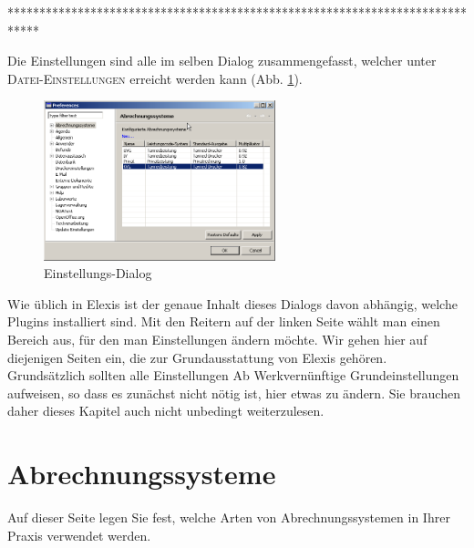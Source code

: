  *****************************************************************************
%

\label{settings}
Die Einstellungen sind alle im selben Dialog zusammengefasst, welcher unter
\textsc{Datei-Einstellungen} erreicht werden kann (Abb. \ref{fig:settingsmain}).
\begin{figure}[h]
\begin{center}
  \includegraphics[width=0.6\textwidth]{images/settingsmain}
  \caption{Einstellungs-Dialog}
  \label{fig:settingsmain}
\end{center}
\end{figure}


Wie üblich in Elexis ist der genaue Inhalt dieses Dialogs davon abhängig,
welche Plugins installiert sind. Mit den Reitern auf der linken Seite wählt man
einen Bereich aus, für den man Einstellungen ändern möchte. Wir gehen hier auf
diejenigen Seiten ein, die zur Grundausstattung von Elexis gehören. Grundsätzlich
sollten alle Einstellungen \glqq Ab Werk\grqq{}vernünftige Grundeinstellungen
aufweisen, so dass es zunächst nicht nötig ist, hier etwas zu ändern. Sie
brauchen daher dieses Kapitel auch nicht unbedingt weiterzulesen.

\section{Abrechnungssysteme}
\label{settings:abrechnungssystem}
Auf dieser Seite legen Sie fest, welche Arten von Abrechnungssystemen in Ihrer Praxis verwendet werden.


